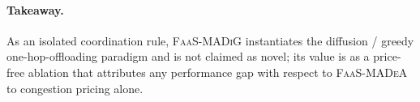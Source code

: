 \paragraph{Takeaway.} As an isolated coordination rule, \textsc{FaaS-MADiG}
instantiates the diffusion / greedy one-hop-offloading paradigm and is not
claimed as novel; its value is as a price-free ablation that attributes any
performance gap with respect to \textsc{FaaS-MADeA} to congestion pricing alone.
